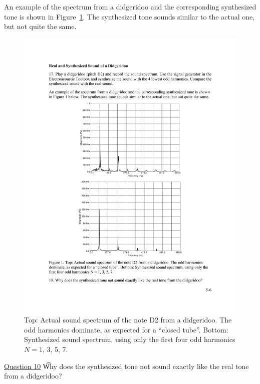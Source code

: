\documentclass[11pt]{NSF}
\begin{document}
An example of the spectrum from a didgeridoo and the 
corresponding synthesized tone is shown in Figure~\ref{f:1}. 
The synthesized tone sounds similar to the actual one, but not quite the same.
%
\begin{figure}[hbtp]
\begin{center}
\includegraphics[width=.7\textwidth]{fig5_1}
\caption{Top: Actual sound spectrum of the note D2 from a didgeridoo. 
The odd harmonics dominate, as expected for a ``closed tube”. 
Bottom: Synthesized sound spectrum, using only the first four odd harmonics 
$N = 1$, 3, 5, 7.}
\label{f:1} 
\end{center} 
\end{figure}
%


\underline{Question 10} \t Why does the synthesized tone not sound
exactly like the real tone from a didgeridoo?
\end{document}

